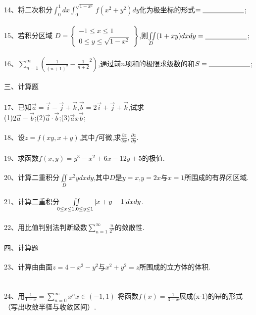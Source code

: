 \documentclass[12pt,a3paper]{article}
\begin{document}
\\\\
14、将二次积分$\int_0^1dx\int_0^{\sqrt{1-x^2}}f(x^2+y^2)dy$化为极坐标的形式$=\underline{\makebox[6em]{}}$;
\\\\
15、若积分区域
$D = \left.
\begin{cases}
  -1 \leq x \leq 1 \\
  0 \leq y \leq \sqrt{1-x^2}
\end{cases}
\right\}
$,则$\iint\limits_D (1+xy)dxdy=\underline{\makebox[6em]{}}$;
\\\\
16、$\sum\limits_{n=1}^\infty(\frac{1}{(n+1)^2}-\frac{1}{n+2}^2)$,通过前$n$项和的极限求级数的和$S=\underline{\makebox[6em]{}}$;
\\\\
三、计算题
\\\\
17、已知$\vec{a}=\vec{i}-\vec{j}+\vec{k}$,$\vec{b}=2\vec{i}+\vec{j}+\vec{k}$,试求\\
(1)$2\vec{a}-\vec{b}$;(2)$\vec{a}\cdot\vec{b}$;(3)$\vec{a}x\vec{b}$;
\\\\
18、设$z=f(xy,x+y)$,其中$f$可微,求$\frac{\partial z}{\partial x}, \frac{\partial z}{\partial y}$.
\\\\
19、求函数$f(x,y)=y^3-x^2+6x-12y+5$的极值.
\\\\
20、计算二重积分$\iint\limits_D x^2ydxdy$,其中$D$是$y=x$,$y=2x$与$x=1$所围成的有界闭区域.
\\\\
21、计算二重积分$\iint\limits_{0\leq x\leq 1, \\0\leq y\leq 1}|x+y-1|dxdy$.
\\\\
22、用比值判别法判断级数$\sum\limits_{n=1}^\infty\frac{n}{2^n}$的敛散性.
\\\\
四、计算题
\\\\
23、计算由曲面$z=4-x^2-y^2$与$x^2+y^2=z$所围成的立方体的体积.
\\\\\\
24、用$\frac{1}{1-x}=\sum\limits_{n=0}^\infty x^n x\in (-1,1)$ 将函数$f(x)=\frac{1}{3-x}$展成(x-1)的幂的形式（写出收敛半径与收敛区间）.
\end{document}
